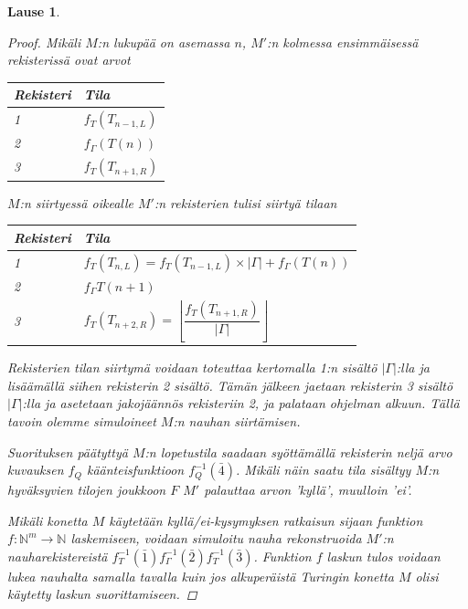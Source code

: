 \documentclass[a4paper, 12pt]{article}
\theoremstyle{definition}
\theoremstyle{plain}
\newtheorem{teor}[mydef]{Lause}
\begin{document}
\begin{teor}
\begin{proof}
Mikäli $M$:n lukupää on asemassa $n$, $M'$:n kolmessa ensimmäisessä rekisterissä ovat arvot 
\begin{center}
\begin{tabular}{l l}
Rekisteri & Tila \\
\hline
1 & $f_T(T_{n-1, L})$ \\
2 & $f_\Gamma(T(n))$ \\
3 & $f_T(T_{n+1, R})$ \\
\end{tabular}
\end{center}
$M$:n siirtyessä oikealle $M'$:n rekisterien tulisi siirtyä tilaan
\begin{center}
\begin{tabular}{l l}
Rekisteri & Tila \\
\hline
1 & $f_T(T_{n, L}) = f_T(T_{n-1, L}) \times |\Gamma| + f_{\Gamma}(T(n))$ \\
2 & $f_{\Gamma}T(n+1)$ \\
3 & $f_T(T_{n+2, R}) = \left\lfloor\dfrac{f_T(T_{n+1, R})}{|\Gamma|}\right\rfloor$ \\
\end{tabular}

\end{center}
Rekisterien tilan siirtymä voidaan toteuttaa kertomalla 1:n sisältö $|\Gamma|$:lla ja lisäämällä siihen rekisterin 2 sisältö. Tämän jälkeen jaetaan rekisterin 3 sisältö $|\Gamma|$:lla ja asetetaan jakojäännös rekisteriin 2, ja palataan ohjelman alkuun. Tällä tavoin olemme simuloineet $M$:n nauhan siirtämisen.

Suorituksen päätyttyä $M$:n lopetustila saadaan syöttämällä rekisterin neljä arvo kuvauksen $f_Q$ käänteisfunktioon $f_Q^{-1}(\bar{4})$. Mikäli näin saatu tila sisältyy $M$:n hyväksyvien tilojen joukkoon $F$ $M'$ palauttaa arvon 'kyllä', muulloin 'ei'.

Mikäli konetta $M$ käytetään kyllä/ei-kysymyksen ratkaisun sijaan funktion $f: \mathbb{N}^m \rightarrow \mathbb{N}$ laskemiseen, voidaan simuloitu nauha rekonstruoida $M'$:n nauharekistereistä $f_T^{-1}(\bar{1}) f_\Gamma^{-1}(\bar{2}) f_T^{-1}(\bar{3})$. Funktion $f$ laskun tulos voidaan lukea nauhalta samalla tavalla kuin jos alkuperäistä Turingin konetta $M$ olisi käytetty laskun suorittamiseen.

\qedhere
\end{proof}
\end{teor}
\end{document}

